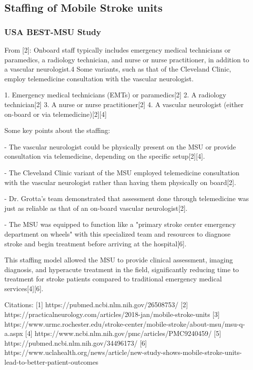 \subsection{Staffing of Mobile Stroke units}

\subsubsection{USA BEST-MSU Study}

From [2]: Onboard staff typically includes emergency medical technicians or paramedics, a radiology technician, and nurse or nurse practitioner, in addition to a vascular neurologist.4 Some variants, such as that of the Cleveland Clinic, employ telemedicine consultation with the vascular neurologist. 

1. Emergency medical technicians (EMTs) or paramedics[2]
2. A radiology technician[2]
3. A nurse or nurse practitioner[2]
4. A vascular neurologist (either on-board or via telemedicine)[2][4]

Some key points about the staffing:

- The vascular neurologist could be physically present on the MSU or provide consultation via telemedicine, depending on the specific setup[2][4].

- The Cleveland Clinic variant of the MSU employed telemedicine consultation with the vascular neurologist rather than having them physically on board[2].

- Dr. Grotta's team demonstrated that assessment done through telemedicine was just as reliable as that of an on-board vascular neurologist[2].

- The MSU was equipped to function like a "primary stroke center emergency department on wheels" with this specialized team and resources to diagnose stroke and begin treatment before arriving at the hospital[6].

This staffing model allowed the MSU to provide clinical assessment, imaging diagnosis, and hyperacute treatment in the field, significantly reducing time to treatment for stroke patients compared to traditional emergency medical services[4][6].

Citations:
[1] https://pubmed.ncbi.nlm.nih.gov/26508753/
[2] https://practicalneurology.com/articles/2018-jan/mobile-stroke-units
[3] https://www.urmc.rochester.edu/stroke-center/mobile-stroke/about-msu/msu-q-a.aspx
[4] https://www.ncbi.nlm.nih.gov/pmc/articles/PMC9240459/
[5] https://pubmed.ncbi.nlm.nih.gov/34496173/
[6] https://www.uclahealth.org/news/article/new-study-shows-mobile-stroke-units-lead-to-better-patient-outcomes


